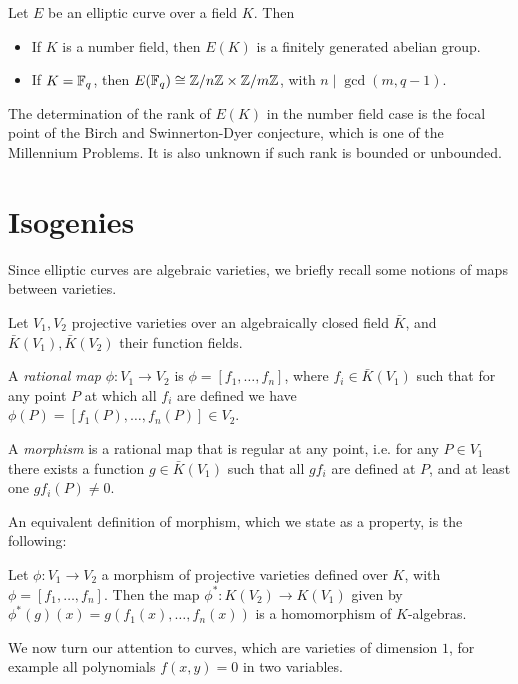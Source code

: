 \begin{theorem}
    Let $E$ be an elliptic curve over a field $K$. Then
    \begin{itemize}
        \item If $K$ is a number field, then $E(K)$ is a finitely generated abelian group.
        \item If $K=\mathbb{F}_q$, then $E(\mathbb{F}_q)\cong\mathbb{Z}/n\mathbb{Z}\times\mathbb{Z}/m\mathbb{Z}$, with $n\mid\gcd(m, q-1)$.
    \end{itemize}
\end{theorem}

The determination of the rank of $E(K)$ in the number field case is the focal point of the Birch and Swinnerton-Dyer conjecture, which is one of the Millennium Problems. It is also unknown if such rank is bounded or unbounded.

\section{Isogenies}

Since elliptic curves are algebraic varieties, we briefly recall some notions of maps between varieties.

\begin{definition}
    Let $V_1,V_2$ projective varieties over an algebraically closed field $\bar K$, and $\bar K(V_1), \bar K(V_2)$ their function fields.
    
    A \emph{rational map} $\phi:V_1\to V_2$ is $\phi=[f_1,\dots,f_n]$, where $f_i\in\bar K(V_1)$ such that for any point $P$ at which all $f_i$ are defined we have $\phi(P)=[f_1(P),\dots,f_n(P)]\in V_2$.
    
    A \emph{morphism} is a rational map that is regular at any point, i.e. for any $P\in V_1$ there exists a function $g\in\bar K(V_1)$ such that all $gf_i$ are defined at $P$, and at least one $gf_i(P)\neq0$.
\end{definition}

An equivalent definition of morphism, which we state as a property, is the following:
\begin{proposition}
    Let $\phi: V_1\to V_2$ a morphism of projective varieties defined over $K$, with $\phi=[f_1,\dots,f_n]$. Then the map $\phi^\ast:K(V_2)\to K(V_1)$ given by $\phi^\ast(g)(x)=g(f_1(x),\dots,f_n(x))$ is a homomorphism of $K$-algebras.
\end{proposition}

We now turn our attention to curves, which are varieties of dimension $1$, for example all polynomials $f(x,y)=0$ in two variables.

